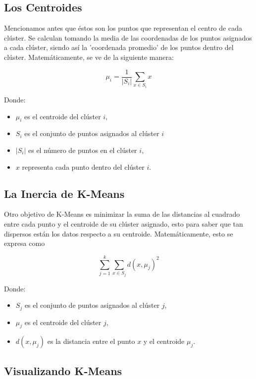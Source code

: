\subsection{Los Centroides}

Mencionamos antes que éstos son los puntos que representan el centro de
cada clúster. Se calculan tomando la media de las coordenadas de los
puntos asignados a cada clúster, siendo así la 'coordenada promedio'
de los puntos dentro del clúster. Matemáticamente, se ve de la siguiente
manera:

\[\mu_i = \frac{1}{|S_i|} \sum_{x \in S_i} x\]

Donde:

\begin{itemize}
\item
  \(\mu_i\) es el centroide del clúster \(i\),
\item
  \(S_i\) es el conjunto de puntos asignados al clúster \(i\)
\item
  \(|S_i|\) es el número de puntos en el clúster \(i\),
\item
  \(x\) representa cada punto dentro del clúster \(i\).
\end{itemize}

\subsection{La Inercia de K-Means}

Otro objetivo de K-Means es minimizar la suma de las distancias al
cuadrado entre cada punto y el centroide de su clúster asignado, esto
para saber que tan dispersos están los datos respecto a su centroide.
Matemáticamente, esto se expresa como

\[\sum_{j=1}^{k} \sum_{x \in S_j} d(x, \mu_j)^2\]

Donde:

\begin{itemize}
\item
  \(S_j\) es el conjunto de puntos asignados al clúster \(j\),
\item
  \(\mu_j\) es el centroide del clúster \(j\),
\item
  \(d(x, \mu_j)\) es la distancia entre el punto \(x\) y el centroide
  \(\mu_j\).
\end{itemize}

\subsection{Visualizando K-Means}

